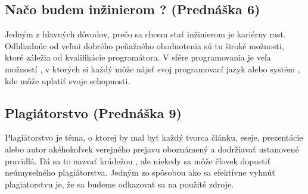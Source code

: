\documentclass[10pt,oneside,slovak,a4paper]{article}
\begin{document}
\subsection{Načo budem inžinierom ? (Prednáška 6)}
\quad Jedným z hlavných dôvodov, prečo sa chcem stať inžinierom je kariérny rast. Odhliadnúc od veľmi dobrého peňažného ohodnotenia sú tu široké možnosti, ktoré záležia od kvalifikácie programátora. V sfére programovania je veľa možností , v ktorých si každý môže nájsť svoj programovací jazyk alebo systém , kde môže uplatiť svoje schopnosti. 

\subsection{Plagiátorstvo (Prednáška 9)}
\quad Plagiátorstvo je téma, o ktorej by mal byť každý tvorca článku, eseje, prezentácie alebo autor akéhokoľvek verejného prejavu oboznámený a dodržiavať ustanovené pravidlá. Dá sa to nazvať krádežou , ale niekedy sa môže človek dopustiť neúmyselného plagiátorstva. Jedným zo spôsobou ako sa efektívne vyhnúť plagiatorstvu je, že sa budeme odkazovať sa na použité zdroje.







\end{document}
